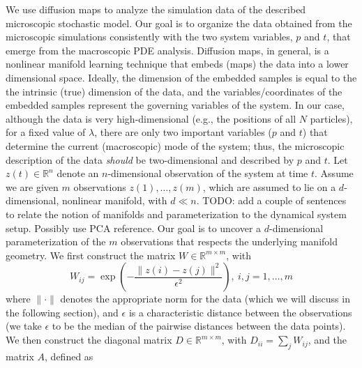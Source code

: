 \documentclass[prl, reprint, final, showkeys]{revtex4-1}
\begin{document}


We use diffusion maps \cite{coifman2005geometric} to analyze the simulation data of the described microscopic stochastic model.
%
Our goal is to organize the data obtained from the microscopic simulations consistently with the two system variables, $p$ and $t$, that emerge from the macroscopic PDE analysis.
%
Diffusion maps, in general, is a nonlinear manifold learning technique that embeds (maps) the data into a lower dimensional space. Ideally, the dimension of the embedded samples is equal to the the intrinsic (true) dimension of the data, and the variables/coordinates of the embedded samples represent the governing variables of the system.
%
In our case, although the data is very high-dimensional (e.g., the positions of all $N$ particles), for a fixed value of $\lambda$, there are only two important variables ($p$ and $t$) that determine the current (macroscopic) mode of the system; thus, the microscopic description of the data {\em should} be two-dimensional and described by $p$ and $t$.
%
Let $z(t) \in \mathbb{R}^n$ denote an $n$-dimensional observation of the system at time $t$. Assume we are given $m$ observations $z(1), \dots, z(m)$, which are assumed to lie on a $d$-dimensional, nonlinear manifold, with $d \ll n$. 
%
TODO: add a couple of sentences to relate the notion of manifolds and parameterization to the dynamical system setup. Possibly use PCA reference.
Our goal is to uncover a $d$-dimensional parameterization of the $m$ observations that respects the underlying manifold geometry.
%
We first construct the matrix $W \in \mathbb{R}^{m \times m}$, with
\begin{equation} \label{eq:W}
W_{ij} = \exp \left( -\frac{\|z(i) - z(j) \|^2}{\epsilon^2} \right), \ i,j=1,\ldots,m
\end{equation}
where $\| \cdot \|$ denotes the appropriate norm for the data (which we will discuss in the following section), and $\epsilon$ is a characteristic distance between the observations (we take $\epsilon$ to be the median of the pairwise distances between the data points).
%
We then construct the diagonal matrix $D \in \mathbb{R}^{m \times m}$, with $D_{ii} = \sum_j W_{ij}$, and the matrix $A$, defined as
\end{document}
